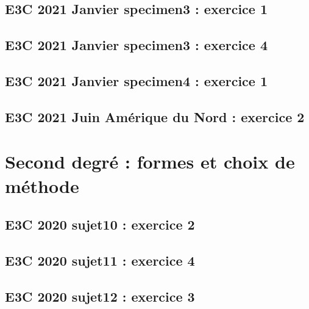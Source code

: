 \documentclass[lang=fr,edition=teacher,layout=sheet]{mxbook}
\begin{document}
\subsection*{E3C 2021 Janvier specimen3 : exercice 1}
\begingroup\endgroup
\par\bigskip
{}\subsection*{E3C 2021 Janvier specimen3 : exercice 4}
\begingroup\endgroup
\par\bigskip
{}\subsection*{E3C 2021 Janvier specimen4 : exercice 1}
\begingroup\endgroup
\par\bigskip
{}\subsection*{E3C 2021 Juin Amérique du Nord : exercice 2}
\begingroup\endgroup
\par\bigskip
\clearpage\section*{Second degré : formes et choix de méthode}
\subsection*{E3C 2020 sujet10 : exercice 2}
\begingroup\endgroup
\par\bigskip
{}\subsection*{E3C 2020 sujet11 : exercice 4}
\begingroup\endgroup
\par\bigskip
{}\subsection*{E3C 2020 sujet12 : exercice 3}
\end{document}
